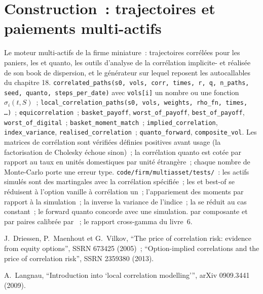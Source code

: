 \section{Construction~: trajectoires et paiements multi-actifs}\label{bld:dv:multi-asset-options:multiasset}

\begin{build}
 Le moteur multi-actifs de la firme miniature~: trajectoires corrélées pour les paniers, les  et quanto, les outils d'analyse de la corrélation implicite-
et réalisée de son book de dispersion, et le générateur sur lequel reposent les autocallables du chapitre 18.
 \texttt{correlated\_paths(s0, vols, corr, times, r, q, n\_paths, seed, quanto, steps\_per\_date)} avec
\texttt{vols[i]} un nombre ou une fonction $\sigma_i(t,S)$~; \texttt{local\_correlation\_paths(s0, vols, weights, rho\_fn, times,
\ldots)}~; \texttt{equicorrelation}~; \texttt{basket\_payoff}, \texttt{worst\_of\_payoff}, \texttt{best\_of\_payoff},
\texttt{worst\_of\_digital}~; \texttt{basket\_moment\_match}~; \texttt{implied\_correlation}, \texttt{index\_variance},
\texttt{realised\_correlation}~; \texttt{quanto\_forward}, \texttt{composite\_vol}.
 Les matrices de corrélation sont vérifiées définies positives avant usage (la factorisation de Cholesky échoue sinon)~; la
corrélation quanto est cotée par rapport au taux en unités domestiques par unité étrangère~; chaque nombre de Monte-Carlo porte une erreur type.
 \texttt{code/firm/multiasset/tests/}~: les actifs simulés sont des martingales avec la corrélation spécifiée~;
les  et best-of se réduisent à l'option vanille à corrélation un~; l'appariement des moments par rapport à la simulation~; la  inverse
la variance de l'indice~; la  se réduit au cas constant~; le forward quanto concorde avec une simulation.
  par composante et  par paires calibrée par ~; le
rapport cross-gamma du livre~6.
\end{build}

\begin{omsources}
\item J.~Driessen, P.~Maenhout et G.~Vilkov, ``The price of correlation risk: evidence from equity options'', SSRN 673425
(2005)~; ``Option-implied correlations and the price of correlation risk'', SSRN 2359380 (2013).
\item A.~Langnau, ``Introduction into `local correlation modelling''', arXiv 0909.3441 (2009).
\end{omsources}

